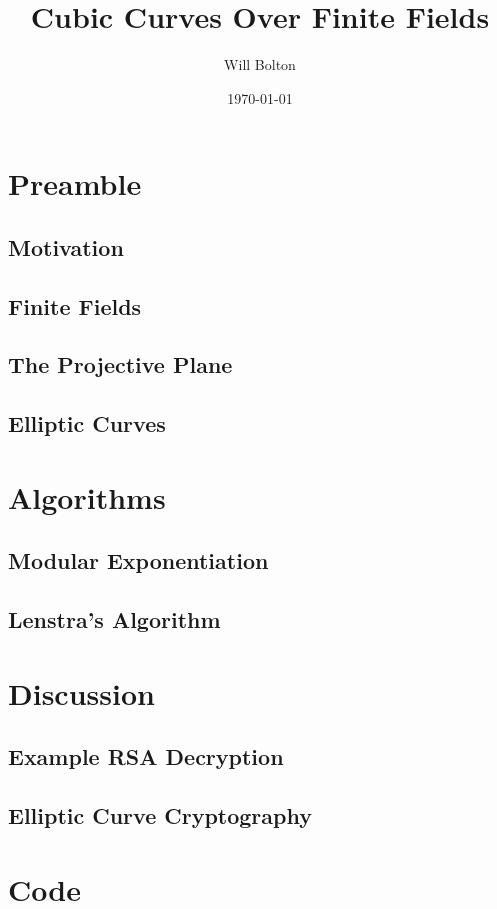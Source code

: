 \documentclass[a4paper,12pt,titlepage,oneside]{article}
\title{Cubic Curves Over Finite Fields}
\author{Will Bolton}
\date{\today}
\begin{document}
\maketitle
\tableofcontents
\clearpage

\section{Preamble}
\subsection{Motivation}

\cite{silverman-rational}
\cite{silverman-arithmetic}
\cite{111-lectures}
\cite{323-lectures}
\cite{menezes1996}
\subsection{Finite Fields}

\subsection{The Projective Plane}

\subsection{Elliptic Curves}




\section{Algorithms}
\subsection{Modular Exponentiation}

\subsection{Lenstra's Algorithm}


\section{Discussion}
\subsection{Example RSA Decryption}

\subsection{Elliptic Curve Cryptography}


\appendix
\section{Code}
%


\end{document}
